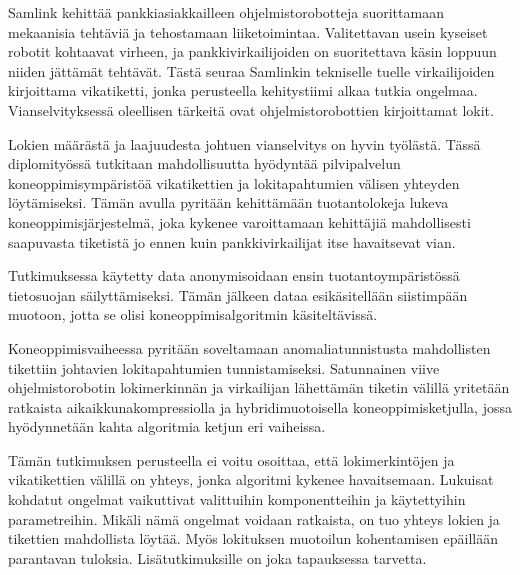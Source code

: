 \documentclass[english, 12pt, a4paper, elec, utf8, a-1b, online]{aaltothesis}
\begin{document}

\newpage
\begin{abstractpage}[finnish]
  Samlink kehittää pankkiasiakkailleen ohjelmistorobotteja
  suorittamaan mekaanisia tehtäviä ja tehostamaan liiketoimintaa.
  Valitettavan usein kyseiset robotit kohtaavat virheen,
  ja pankkivirkailijoiden on suoritettava käsin loppuun
  niiden jättämät tehtävät.
  Tästä seuraa Samlinkin tekniselle tuelle virkailijoiden kirjoittama vikatiketti,
  jonka perusteella kehitystiimi alkaa tutkia ongelmaa.
  Vianselvityksessä oleellisen tärkeitä ovat ohjelmistorobottien kirjoittamat lokit.

  Lokien määrästä ja laajuudesta johtuen
  vianselvitys on hyvin työlästä.
  Tässä diplomityössä tutkitaan mahdollisuutta
  hyödyntää pilvipalvelun koneoppimisympäristöä
  vikatikettien ja lokitapahtumien välisen yhteyden löytämiseksi.
  Tämän avulla pyritään kehittämään tuotantolokeja lukeva koneoppimisjärjestelmä,
  joka kykenee varoittamaan kehittäjiä mahdollisesti saapuvasta tiketistä
  jo ennen kuin pankkivirkailijat itse havaitsevat vian.

  Tutkimuksessa käytetty data anonymisoidaan ensin tuotantoympäristössä
  tietosuojan säilyttämiseksi.
  Tämän jälkeen dataa esikäsitellään siistimpään muotoon,
  jotta se olisi koneoppimisalgoritmin käsiteltävissä.

  Koneoppimisvaiheessa pyritään soveltamaan anomaliatunnistusta
  mahdollisten tikettiin johtavien lokitapahtumien tunnistamiseksi.
  Satunnainen viive ohjelmistorobotin lokimerkinnän ja virkailijan lähettämän tiketin välillä
  yritetään ratkaista aikaikkunakompressiolla ja hybridimuotoisella koneoppimisketjulla,
  jossa hyödynnetään kahta algoritmia ketjun eri vaiheissa.

  Tämän tutkimuksen perusteella ei voitu osoittaa,
  että lokimerkintöjen ja vikatikettien välillä on yhteys,
  jonka algoritmi kykenee havaitsemaan.
  Lukuisat kohdatut ongelmat vaikuttivat valittuihin komponentteihin
  ja käytettyihin parametreihin.
  Mikäli nämä ongelmat voidaan ratkaista,
  on tuo yhteys lokien ja tikettien mahdollista löytää.
  Myös lokituksen muotoilun kohentamisen epäillään parantavan tuloksia.
  Lisätutkimuksille on joka tapauksessa tarvetta.
\end{abstractpage}
\end{document}
